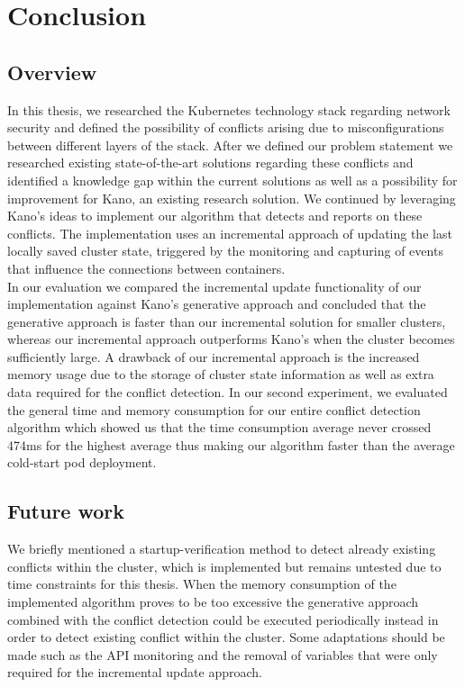 \chapter{Conclusion}                     \label{ch:conclusion}
\section{Overview} \label{sec:overview}
In this thesis, we researched the Kubernetes technology stack regarding network security and defined the possibility of conflicts arising due to misconfigurations between different layers of the stack. After we defined our problem statement we researched existing state-of-the-art solutions regarding these conflicts and identified a knowledge gap within the current solutions as well as a possibility for improvement for Kano, an existing research solution. We continued by leveraging Kano's ideas to implement our algorithm that detects and reports on these conflicts. The implementation uses an incremental approach of updating the last locally saved cluster state, triggered by the monitoring and capturing of events that influence the connections between containers. 
\\[10pt]

In our evaluation we compared the incremental update functionality of our implementation against Kano's generative approach and concluded that the generative approach is faster than our incremental solution for smaller clusters, whereas our incremental approach outperforms Kano's when the cluster becomes sufficiently large. A drawback of our incremental approach is the increased memory usage due to the storage of cluster state information as well as extra data required for the conflict detection. In our second experiment, we evaluated the general time and memory consumption for our entire conflict detection algorithm which showed us that the time consumption average never crossed 474ms for the highest average thus making our algorithm faster than the average cold-start pod deployment.
\\[10pt]



\section{Future work} \label{sec:futurework}
We briefly mentioned a startup-verification method to detect already existing conflicts within the cluster, which is implemented but remains untested due to time constraints for this thesis. When the memory consumption of the implemented algorithm proves to be too excessive the generative approach combined with the conflict detection could be executed periodically instead in order to detect existing conflict within the cluster. Some adaptations should be made such as the API monitoring and the removal of variables that were only required for the incremental update approach.
\\[10pt]

